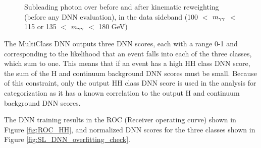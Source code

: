 \begin{figure}[h!]
    \setcounter{subfigure}{0}
    \centering
    \qquad
    \caption{Subleading photon \pt over \mgg before and after kinematic reweighting (before any DNN evaluation), in the data sideband (100 $<$ $m_{\gamma\gamma}$ $<$ 115 or 135 $<$ $m_{\gamma\gamma}$ $<$ 180 GeV)}
    \label{fig:Kin_Reweight_5}
\end{figure} 

\clearpage 

The MultiClass DNN outputs three DNN scores, each with a range 0-1 and corresponding to the likelihood that an event falls into each of the three classes, which sum to one. This means that if an event has a high 
HH class DNN score, the sum of the H and continuum background DNN scores must be small. Because of this constraint, only the output HH class DNN score is used in the analysis for categorization as 
it has a known correlation to the output H and continuum background DNN scores. 

The DNN training results in the ROC (Receiver operating curve) shown in Figure \ref{fig:ROC_HH}, and normalized DNN scores for the three classes shown in Figure \ref{fig:SL_DNN_overfitting_check}.

